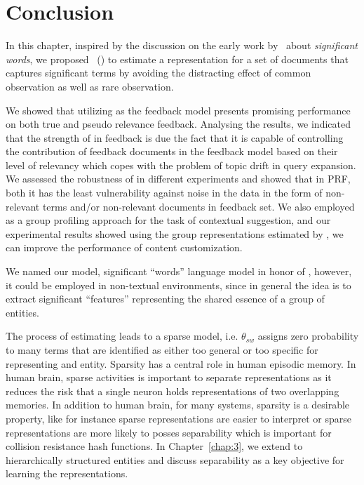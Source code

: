 



\section{Conclusion} 
In this chapter, inspired by the discussion on the early work by~\citet{Luhn:1958} about \emph{significant words}, we proposed \emph{\swlms}\ (\acswlm) to estimate a representation for a set of documents that captures significant terms by avoiding the distracting effect of common observation as well as rare observation.

We showed that utilizing \acswlm as the feedback model presents promising performance on both true and pseudo relevance feedback. Analysing the results, we indicated that the strength of \acswlm in feedback is due the fact that it is capable of controlling the contribution of feedback documents in the feedback model based on their level of relevancy which copes with the problem of topic drift in query expansion. We assessed the robustness of \acswlm in different experiments and showed that in PRF, both it has the least vulnerability against noise in the data in the form of non-relevant terms and/or non-relevant documents in feedback set.
%
We also employed \acswlm as a group profiling approach for the task of contextual suggestion, and our experimental results showed using the group representations estimated by \acswlm, we can improve the performance of content customization. 

We named our model, significant ``words'' language model in honor of \citeauthor{Luhn:1958}, however, it could be employed in non-textual environments, since in general the idea is to extract significant ``features'' representing the shared essence of a group of entities.

The process of estimating \acswlm leads to a sparse model, i.e. $\theta_{sw}$ assigns zero probability to many terms that are identified as either too general or too specific for representing and entity. Sparsity has a central role in human episodic memory.  In human brain, sparse activities is important to separate representations as it reduces the risk that a single neuron holds representations of two overlapping memories\citep{cho2018blockchain}. In addition to human brain, for many systems, sparsity is a desirable property, like for instance sparse representations are easier to interpret or sparse representations are more likely to posses separability which is important for collision resistance hash functions. 
In Chapter~\ref{chap:3}, we extend \acswlm to hierarchically structured entities and discuss separability as a key objective for learning the representations.


